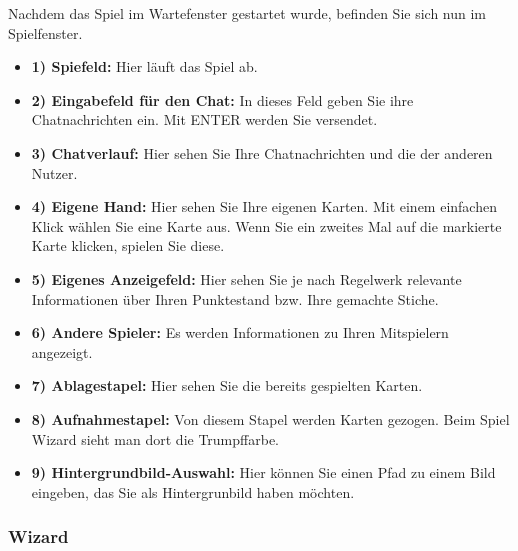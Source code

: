 \documentclass[titlepage,10pt,a4paper]{article}
\begin{document}
Nachdem das Spiel im \gls{Wartefenster} gestartet wurde, befinden Sie sich nun im Spielfenster.
\begin{itemize}
	\item \textbf{1) Spiefeld:} Hier läuft das Spiel ab.
	\item \textbf{2) Eingabefeld für den Chat:} In dieses Feld geben Sie ihre Chatnachrichten ein. Mit ENTER werden Sie versendet.
	\item \textbf{3) Chatverlauf:} Hier sehen Sie Ihre Chatnachrichten und die der anderen Nutzer.
	\item \textbf{4) Eigene Hand:} Hier sehen Sie Ihre eigenen Karten. Mit einem einfachen Klick wählen Sie eine Karte aus. Wenn Sie ein zweites Mal auf die markierte Karte klicken, spielen Sie diese.
	\item \textbf{5) Eigenes Anzeigefeld:} Hier sehen Sie je nach Regelwerk relevante Informationen über Ihren Punktestand bzw. Ihre gemachte Stiche.
	\item \textbf{6) Andere Spieler:} Es werden Informationen zu Ihren Mitspielern angezeigt.
	\item \textbf{7) Ablagestapel:} Hier sehen Sie die bereits gespielten Karten.
	\item \textbf{8) Aufnahmestapel:} Von diesem Stapel werden Karten gezogen. Beim Spiel Wizard sieht man dort die Trumpffarbe.
	\item \textbf{9) Hintergrundbild-Auswahl:} Hier können Sie einen Pfad zu einem Bild eingeben, das Sie als Hintergrunbild haben möchten.
\end{itemize}


\subsubsection{Wizard}
\end{document}
